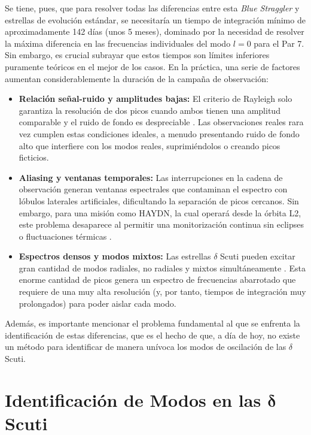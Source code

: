Se tiene, pues, que para resolver todas las diferencias entre esta \textit{Blue Straggler} y estrellas de evolución estándar, se necesitaría un tiempo de integración mínimo de aproximadamente 142 días (unos 5 meses), dominado por la necesidad de resolver la máxima diferencia en las frecuencias individuales del modo $l=0$ para el Par 7. Sin embargo, es crucial subrayar que estos tiempos son límites inferiores puramente teóricos en el mejor de los casos. En la práctica, una serie de factores aumentan considerablemente la duración de la campaña de observación:

\begin{itemize}
  \item \textbf{Relación señal-ruido y amplitudes bajas:} El criterio de Rayleigh solo garantiza la resolución de dos picos cuando ambos tienen una amplitud comparable y el ruido de fondo es despreciable \citep{ChristensenDalsgaard2019}. Las observaciones reales rara vez cumplen estas condiciones ideales, a menudo presentando ruido de fondo alto que interfiere con los modos reales, suprimiéndolos o creando picos ficticios.
  \item \textbf{Aliasing y ventanas temporales:} Las interrupciones en la cadena de observación generan ventanas espectrales que contaminan el espectro con lóbulos laterales artificiales, dificultando la separación de picos cercanos. Sin embargo, para una misión como HAYDN, la cual operará desde la órbita L2, este problema desaparece al permitir una monitorización continua sin eclipses o fluctuaciones térmicas \citep{haydn_mission_proposal_2026}.
  \item \textbf{Espectros densos y modos mixtos:} Las estrellas $\delta$ Scuti pueden excitar gran cantidad de modos radiales, no radiales y mixtos simultáneamente \citep{Handler_2009}. Esta enorme cantidad de picos genera un espectro de frecuencias abarrotado que requiere de una muy alta resolución (y, por tanto, tiempos de integración muy prolongados) para poder aislar cada modo.
\end{itemize}

Además, es importante mencionar el problema fundamental al que se enfrenta la identificación de estas diferencias, que es el hecho de que, a día de hoy, no existe un método para identificar de manera unívoca los modos de oscilación de las $\delta$ Scuti.

\section{Identificación de Modos en las $\boldsymbol{\delta}$ Scuti}

